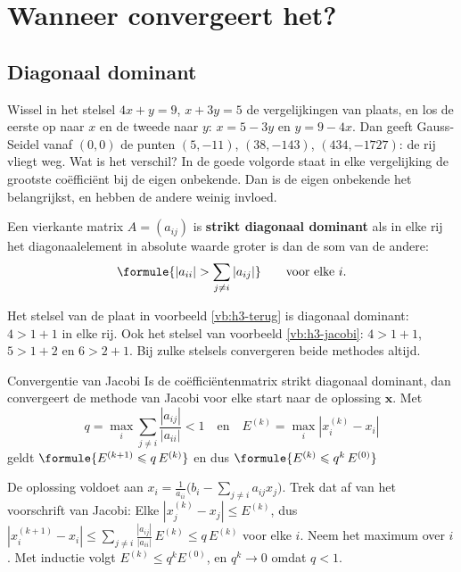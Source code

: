 \begin{oefeningen}
\end{oefeningen}

\section{Wanneer convergeert het?}

\subsection{Diagonaal dominant}

Wissel in het stelsel $4x + y = 9$, $x + 3y = 5$ de vergelijkingen van plaats, en los de eerste op naar $x$ en de tweede naar $y$: $x = 5 - 3y$ en $y = 9 - 4x$. Dan geeft Gauss-Seidel vanaf $(0, 0)$ de punten $(5, -11)$, $(38, -143)$, $(434, -1727)$: de rij vliegt weg. Wat is het verschil? In de goede volgorde staat in elke vergelijking de grootste coëfficiënt bij de eigen onbekende. Dan is de eigen onbekende het belangrijkst, en hebben de andere weinig invloed.

\begin{theorie}
Een vierkante matrix $A = (a_{ij})$ is \textbf{\textcolor{accent}{strikt diagonaal dominant}} als in elke rij het diagonaalelement in absolute waarde groter is dan de som van de andere:
\[
\formule{|a_{ii}| > \sum_{j \neq i} |a_{ij}|} \qquad \text{voor elke } i .
\]
\end{theorie}

Het stelsel van de plaat in voorbeeld \ref{vb:h3-terug} is diagonaal dominant: $4 > 1 + 1$ in elke rij. Ook het stelsel van voorbeeld \ref{vb:h3-jacobi}: $4 > 1 + 1$, $5 > 1 + 2$ en $6 > 2 + 1$. Bij zulke stelsels convergeren beide methodes altijd.

\begin{theorie}
\begin{stelling}{Convergentie van Jacobi}
Is de coëfficiëntenmatrix strikt diagonaal dominant, dan convergeert de methode van Jacobi voor elke start naar de oplossing $\mathbf{x}$. Met
\[
q = \max_i \sum_{j \neq i} \frac{|a_{ij}|}{|a_{ii}|} < 1 \quad \text{en} \quad E^{(k)} = \max_i |x_i^{(k)} - x_i|
\]
geldt \qquad $\formule{E^{(k+1)} \leqslant q\,E^{(k)}}$ \qquad en dus \qquad $\formule{E^{(k)} \leqslant q^k\,E^{(0)}}$
\end{stelling}

\begin{bewijs}
De oplossing voldoet aan $x_i = \frac{1}{a_{ii}}\bigl(b_i - \sum_{j \neq i} a_{ij} x_j\bigr)$. Trek dat af van het voorschrift van Jacobi:
Elke $|x_j^{(k)} - x_j| \leqslant E^{(k)}$, dus $|x_i^{(k+1)} - x_i| \leqslant \sum_{j \neq i} \frac{|a_{ij}|}{|a_{ii}|}\,E^{(k)} \leqslant q\,E^{(k)}$ voor elke $i$. Neem het maximum over $i$. Met inductie volgt $E^{(k)} \leqslant q^k E^{(0)}$, en $q^k \to 0$ omdat $q < 1$.
\end{bewijs}
\end{theorie}

